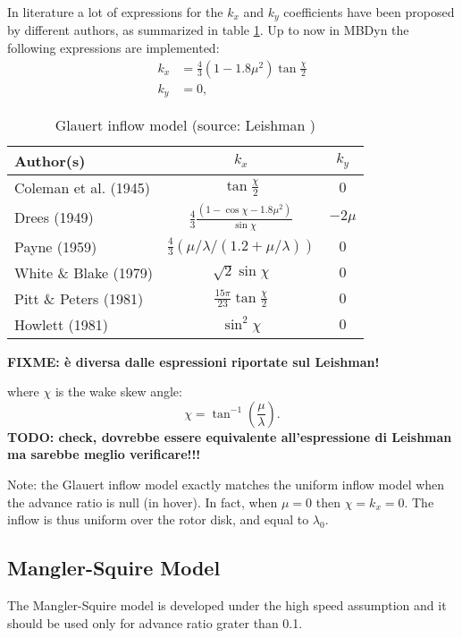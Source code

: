In literature a lot of expressions for the $k_x$ and $k_y$ coefficients have
been proposed by different authors, as summarized in table \ref{tab:GlauertCoeff}.
Up to now in MBDyn the following expressions are
implemented:
\begin{align}
k_x &=  \frac{4}{3} \left( 1 - 1.8 \mu^2 \right) \tan{\frac{\chi}{2}}
\\
k_y &= 0,
\end{align}
\begin{table}[h]
\centering
\caption{Glauert inflow model (source: Leishman \cite{LEISHMAN-2006})}\label{tab:GlauertCoeff}
\begin{tabular}{l|c|c}
\textbf{Author(s)} & $k_x$ & $k_y$\\
\hline
Coleman et al. (1945)	&	
$\tan{\frac{\chi}{2}}$	&	$0$\\
Drees (1949)		&	
$\frac{4}{3}\frac{\left( 1 - \cos{\chi} -1.8 \mu^2\right)}{\sin{\chi}} $	&	$-2 \mu$\\
Payne (1959)		&
$\frac{4}{3} ( \mu/ \lambda/ (1.2 + \mu/\lambda))$	&	$0$\\
White \& Blake (1979)	&
$\sqrt{2} \sin{\chi}$	&	$0$\\
Pitt \& Peters (1981)	&
$\frac{15 \pi}{23} \tan{\frac{\chi}{2}}$	&	$0$\\
Howlett (1981)		&
$ \sin^2{\chi}$	&	$0$\\
\end{tabular}
\end{table}

\textbf{FIXME: \`e diversa dalle espressioni riportate sul Leishman!}

where $\chi$ is the wake skew angle:
\begin{equation}
\chi = \tan^{-1}\left( \frac{\mu}{\lambda} \right).
\end{equation}
\textbf{TODO: check, dovrebbe essere equivalente all'espressione di Leishman ma
sarebbe meglio verificare!!!}

Note: the Glauert inflow model exactly matches the uniform inflow model
when the advance ratio is null (in hover).
In fact, when $\mu = 0$ then $\chi = k_x = 0$.
The inflow is thus uniform over the rotor disk, and equal to $\lambda_0$.

\subsection{Mangler-Squire Model}

The Mangler-Squire model is developed under the high speed assumption
and it should be used only for advance ratio grater than 0.1.

